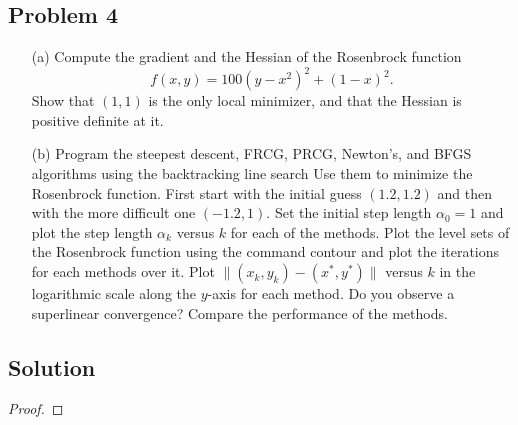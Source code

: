 \documentclass[12pt]{report}
\begin{document}
\begin{problem}%
\subsection*{Problem 4}

\begin{enumerate}
    \item [(a)] Compute the gradient and the Hessian of the Rosenbrock function
    \[
         f(x,y) = 100(y - x^2)^2 + (1-x)^2.
    \]
    Show that $(1,1)$ is the only local minimizer, and that the Hessian is positive definite at it.
    \item [(b)] Program the steepest descent, FRCG, PRCG, Newton's, and BFGS algorithms using the backtracking line search Use them to minimize the Rosenbrock function. First start with the initial guess $(1.2, 1.2)$ and then with the more difficult one $(-1.2, 1)$. Set the initial step length $\alpha_0 = 1$ and plot the step length $\alpha_k$ versus $k$ for each of the methods. Plot the level sets of the Rosenbrock function using the command contour and plot the iterations for each methods over it. Plot $\|(x_k,y_k) - (x^*,y^*)\|$ versus $k$ in the logarithmic scale along the $y$-axis for each method. Do you observe a superlinear convergence? Compare the performance of the methods.
\end{enumerate}

\subsection*{Solution}
\begin{proof}


\end{proof}
\end{problem}
\end{document}

